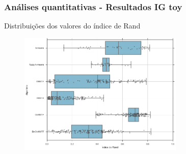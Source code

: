\documentclass[10pt]{beamer}
\begin{document}
\begin{frame}
\frametitle{Análises quantitativas - Resultados IG toy}

Distribuições dos valores do índice de Rand
\begin{figure}[H]
    \centering
    \includegraphics[width=0.7\textwidth]{img/boxplot-all-rand-igtoy.png}
\end{figure}


\end{frame}

\end{document}
